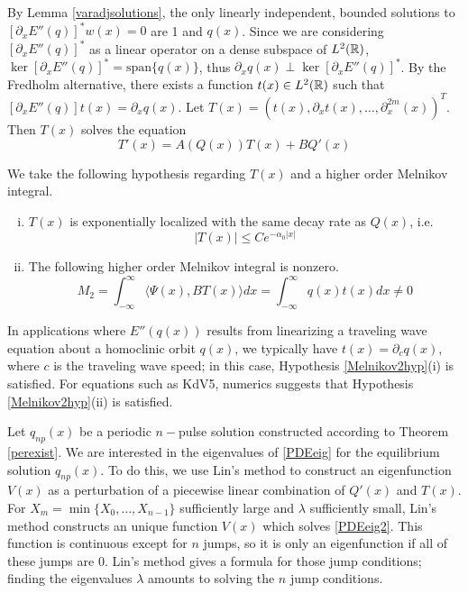 \documentclass[thesis.tex]{subfiles}
\begin{document}
By Lemma \ref{varadjsolutions}, the only linearly independent, bounded solutions to $[\partial_x E''(q)]^* w(x) = 0$ are 1 and $q(x)$. Since we are considering $[\partial_x E''(q)]^*$ as a linear operator on a dense subspace of $L^2({\mathbb R})$, $\ker [\partial_x E''(q)]^* = \text{span}\{ q(x) \}$, thus $\partial_x q(x) \perp \ker [\partial_x E''(q)]^*$. By the Fredholm alternative, there exists a function $t(x) \in L^2({\mathbb R})$ such that $[ \partial_x E''(q) ]t(x) = \partial_x q(x)$. Let $T(x) = (t(x), \partial_x t(x), \dots, \partial_x^{2m}(x))^T$. Then $T(x)$ solves the equation
\begin{equation}\label{eqforT}
T'(x) = A(Q(x))T(x) + B Q'(x)
\end{equation}

We take the following hypothesis regarding $T(x)$ and a higher order Melnikov integral.
\begin{hypothesis}\label{Melnikov2hyp}
\begin{enumerate}[(i)]
\item $T(x)$ is exponentially localized with the same decay rate as $Q(x)$, i.e.
\begin{equation}
|T(x)| \leq C e^{-\alpha_0 |x|}
\end{equation}
\item The following higher order Melnikov integral is nonzero.
\begin{equation}\label{M2}
M_2 = \int_{-\infty}^\infty \langle \Psi(x), B T(x) \rangle dx =
\int_{-\infty}^\infty q(x) t(x) dx \neq 0
\end{equation}
\end{enumerate}
\end{hypothesis}
In applications where $E''(q(x))$ results from linearizing a traveling wave equation about a homoclinic orbit $q(x)$, we typically have $t(x) = \partial_c q(x)$, where $c$ is the traveling wave speed; in this case, Hypothesis \ref{Melnikov2hyp}(i) is satisfied. For equations such as KdV5, numerics suggests that Hypothesis \ref{Melnikov2hyp}(ii) is satisfied.

Let $q_{np}(x)$ be a periodic $n-$pulse solution constructed according to Theorem \ref{perexist}. We are interested in the eigenvalues of \eqref{PDEeig} for the equilibrium solution $q_{np}(x)$. To do this, we use Lin's method to construct an eigenfunction $V(x)$ as a perturbation of a piecewise linear combination of $Q'(x)$ and $T(x)$. For $X_m = \min\{X_0, \dots, X_{n-1} \}$ sufficiently large and $\lambda$ sufficiently small, Lin's method constructs an unique function $V(x)$ which solves \eqref{PDEeig2}. This function is continuous except for $n$ jumps, so it is only an eigenfunction if all of these jumps are 0. Lin's method gives a formula for those jump conditions; finding the eigenvalues $\lambda$ amounts to solving the $n$ jump conditions.
\end{document}
